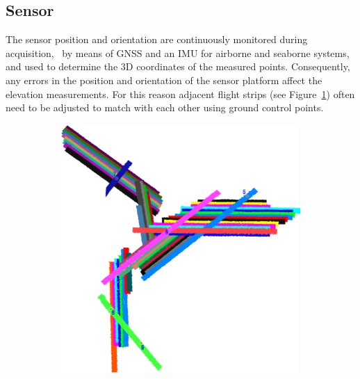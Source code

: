 \subsection{Sensor}
The sensor position and orientation are continuously monitored during acquisition, \eg\  by means of GNSS and an IMU for airborne and seaborne systems, and used to determine the 3D coordinates of the measured points. 
Consequently, any errors in the position and orientation of the sensor platform affect the elevation measurements. 
For this reason adjacent flight strips (see Figure~\ref{fig:lidarStrips}) often need to be adjusted to match with each other using ground control points. 
\begin{figure}
	\centering
	\begin{subfigure}{0.4\linewidth}
		\includegraphics[width=\textwidth]{figs/lidar_strips.png}
		\label{fig:lidarStrips}
	\end{subfigure}
	\quad
	\begin{subfigure}{0.4\linewidth}

\end{subfigure}
\end{figure}
